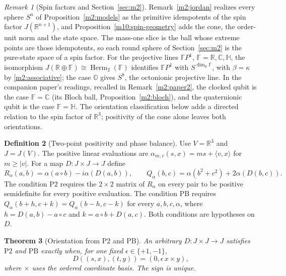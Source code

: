 \documentclass[11pt,reqno]{amsart}
\newtheorem{theorem}{Theorem}[section]
\theoremstyle{definition}
\newtheorem{definition}[theorem]{Definition}
\theoremstyle{remark}
\newtheorem{remark}[theorem]{Remark}
\numberwithin{equation}{section}
\newcommand{\R}{\mathbb{R}}
\newcommand{\C}{\mathbb{C}}
\newcommand{\HH}{\mathbb{H}}
\newcommand{\ip}[2]{\langle #1,#2\rangle}
\begin{document}
\begin{remark}[Spin factors and Section~\ref{sec:m2}]\label{m10:spin-5A}
Remark~\ref{m2:jordan} realizes every sphere \(S^n\) of
Proposition~\ref{m2:models} as the primitive idempotents of the spin
factor \(J(\R^{n+1})\), and Proposition~\ref{m10:spin-geometry} adds the
cone, the order-unit norm and the state space. The mass-one slice is the
ball whose extreme points are those idempotents, so each round sphere of
Section~\ref{sec:m2} is the pure-state space of a spin factor. For the
projective lines \(\mathbb FP^1\), \(\mathbb F=\R,\C,\HH\), the
isomorphism \(J(\R\oplus\mathbb F)\cong\operatorname{Herm}_2(\mathbb F)\)
identifies \(\mathbb FP^1\) with \(S^{\dim_\R\mathbb F}\), with
\(\beta=\kappa\) by \eqref{m2:associative}; the case \(\mathbb O\) gives
\(S^8\), the octonionic projective line. In the companion paper's
readings, recalled in Remark~\ref{m2:paper2}, the clocked qubit is the
case \(\mathbb F=\C\) (its Bloch ball, Proposition~\ref{m2:bloch}), and the
quaternionic qubit is the case \(\mathbb F=\HH\). The orientation
classification below adds a directed relation to the spin factor of
\(\R^3\); positivity of the cone alone leaves both orientations.
\end{remark}

\begin{definition}[Two-point positivity and phase balance]\label{m10:contract}
Use \(V=\R^3\) and \(J=J(V)\). The positive linear evaluations are
\(\alpha_{m,v}(s,x)=ms+\ip{v}{x}\) for \(m\ge |v|\).
For a map \(D:J\times J\to J\) define
\[
 R_\alpha(a,b)=\alpha(a\circ b)-i\alpha(D(a,b)),\qquad
 Q_\alpha(b,c)=\alpha(b^2+c^2)+2\alpha(D(b,c)).
\]
The condition \(\mathrm{P2}\) requires the \(2\times2\) matrix
of \(R_\alpha\) on every pair to be positive semidefinite for
every positive evaluation. The condition \(\mathrm{PB}\) requires
\(Q_\alpha(b+h,c+k)=Q_\alpha(b-h,c-k)\) for every \(a,b,c,\alpha\),
where \(h=D(a,b)-a\circ c\) and \(k=a\circ b+D(a,c)\).
Both conditions are hypotheses on \(D\).
\end{definition}

\begin{theorem}[Orientation from \(\mathrm{P2}\) and \(\mathrm{PB}\)]
\label{m10:orientation}
An arbitrary \(D:J\times J\to J\) satisfies
\(\mathrm{P2}\) and \(\mathrm{PB}\) exactly when, for one fixed
\(\epsilon\in\{+1,-1\}\),
\[
 D((s,x),(t,y))=(0,\epsilon\,x\times y),
\]
where \(\times\) uses the ordered coordinate basis. The sign is unique.
\end{theorem}
\end{document}
